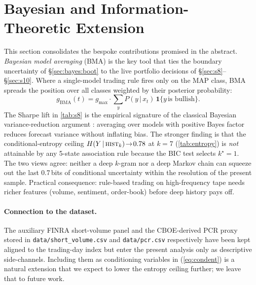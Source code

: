 \documentclass[runningheads]{llncs}
\begin{document}
\section{Bayesian and Information-Theoretic Extension}\label{sec:ext}
This section consolidates the bespoke contributions promised in the
abstract. \emph{Bayesian model averaging} (BMA) is the key tool that
ties the boundary uncertainty of \S\ref{sec:bayes:boot} to the live
portfolio decisions of \S\ref{sec:s8}--\S\ref{sec:s10}. Where a single-model
trading rule fires only on the MAP class, BMA spreads the position over
all classes weighted by their posterior probability:
\begin{equation}
g_{\mathrm{BMA}}(t)=g_{\max}\!\cdot\sum_{y}\!P(y\,|\,x_{t})\,
\mathbf{1}\{y\,\text{is bullish}\}.
\end{equation}
The Sharpe lift in \cref{tab:s8} is the empirical signature of the
classical Bayesian variance-reduction argument
\cite{hoeting1999bma}: averaging over models with positive Bayes
factor reduces forecast variance without inflating bias. The stronger
finding is that the conditional-entropy ceiling
$H(Y\,|\,\textsc{hist}_{k})\!\to\!\num{0.78}$ at $k{=}7$
(\cref{tab:entropy}) is \emph{not} attainable by any 5-state association
rule because the BIC test selects $k^{\star}{=}1$. The two views agree:
neither a deep $k$-gram nor a deep Markov chain can squeeze out the
last 0.7\,bits of conditional uncertainty within the resolution of the
present sample. Practical consequence: rule-based trading on
high-frequency tape needs richer features (volume, sentiment,
order-book) before deep history pays off.

\paragraph{Connection to the dataset.} The auxiliary FINRA short-volume
panel and the CBOE-derived PCR proxy stored in
\texttt{data/short\_volume.csv} and \texttt{data/pcr.csv} respectively
have been kept aligned to the trading-day index but enter the present
analysis only as descriptive side-channels. Including them as
conditioning variables in (\ref{eq:condent}) is a natural extension
that we expect to lower the entropy ceiling further; we leave that to
future work.

\end{document}
